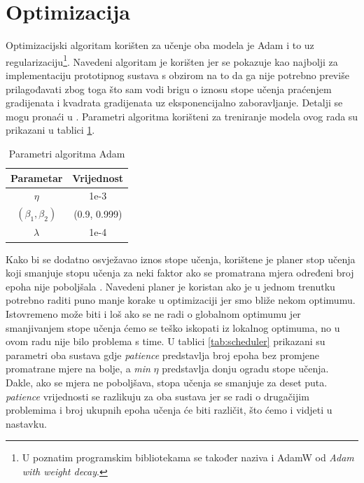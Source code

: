\documentclass[times, utf8, diplomski]{fer}
\begin{document}
\section{Optimizacija}
Optimizacijski algoritam korišten za učenje oba modela je Adam i to uz regularizaciju\footnote{U poznatim programskim bibliotekama se također naziva i AdamW od \textit{Adam with weight decay}.}. Navedeni algoritam je korišten jer se pokazuje kao najbolji za implementaciju prototipnog sustava s obzirom na to da ga nije potrebno previše prilagođavati zbog toga što sam vodi brigu o iznosu stope učenja praćenjem gradijenata i kvadrata gradijenata uz eksponencijalno zaboravljanje. Detalji se mogu pronaći u \citep{adamw-paper}. Parametri algoritma korišteni za treniranje modela ovog rada su prikazani u tablici \ref{tab:adamw}.

\begin{table}[H]
    \centering
    \begin{tabular}{|c|c|}
        \hline
        Parametar & Vrijednost \\
        \hline \hline
        $\eta$ & 1e-3 \\
        \hline
        $(\beta_1,\beta_2)$ & {(0.9, 0.999)} \\
        \hline
        $\lambda$\footnotemark & 1e-4 \\
        \hline
    \end{tabular}
    \caption{Parametri algoritma Adam}
    \label{tab:adamw}
\end{table}

Kako bi se dodatno osvježavao iznos stope učenja, korištene je planer stop učenja  koji smanjuje stopu učenja za neki faktor ako se promatrana mjera određeni broj epoha nije poboljšala . Navedeni planer je koristan ako je u jednom trenutku potrebno raditi puno manje korake u optimizaciji jer smo bliže nekom optimumu. Istovremeno može biti i loš ako se ne radi o globalnom optimumu jer smanjivanjem stope učenja ćemo se teško iskopati iz lokalnog optimuma, no u ovom radu nije bilo problema s time. U tablici \ref{tab:scheduler} prikazani su parametri oba sustava gdje \textit{patience} predstavlja broj epoha bez promjene promatrane mjere na bolje, a \textit{min} $\eta$ predstavlja donju ogradu stope učenja. Dakle, ako se mjera ne poboljšava, stopa učenja se smanjuje za deset puta. \textit{patience} vrijednosti se razlikuju za oba sustava jer se radi o drugačijim problemima i broj ukupnih epoha učenja će biti različit, što ćemo i vidjeti u nastavku.
\end{document}
